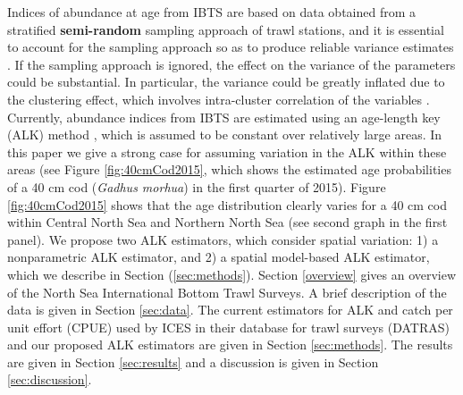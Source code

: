 \documentclass[a4paper 12pt]{article}
\numberwithin{equation}{section}
\begin{document}
\indent Indices of abundance at age from IBTS  are based on data obtained from a stratified {\bf semi-random} sampling approach of trawl stations,  and  it is essential to account for the sampling approach so as to produce reliable variance estimates \citep{lehtonen2004practical}. If the sampling approach is ignored, the effect on the variance  of the parameters could be substantial.  In particular, the variance could be greatly inflated  due to the clustering effect, which involves intra-cluster correlation of the variables \citep{aanes2015efficient, lehtonen2004practical}. Currently, abundance indices from  IBTS are estimated using an age-length key (ALK) method \citep{fridriksson1934calculation}, which is assumed to be constant  over relatively large areas. In this paper we give a strong case for assuming variation in the ALK within these areas (see Figure \ref{fig:40cmCod2015}, which shows the estimated age probabilities of a 40 cm cod (\emph{Gadhus morhua}) in the first quarter of 2015). Figure \ref{fig:40cmCod2015} shows that the age distribution clearly varies for a 40 cm cod within Central North Sea and Northern North Sea (see second graph in the first panel). We propose two ALK estimators, which consider spatial variation: 1) a nonparametric  ALK estimator, and 2) a spatial model-based ALK estimator, which we describe in Section (\ref{sec:methods}). Section \ref{overview} gives an  overview of the  North Sea International Bottom Trawl Surveys. A brief description of the data is given in Section \ref{sec:data}. The current estimators for ALK and catch per unit effort (CPUE) used by ICES in their database for trawl surveys (DATRAS) and our proposed ALK estimators are given in Section \ref{sec:methods}. The results are given in Section \ref{sec:results} and a discussion is given in Section \ref{sec:discussion}.
\end{document}
